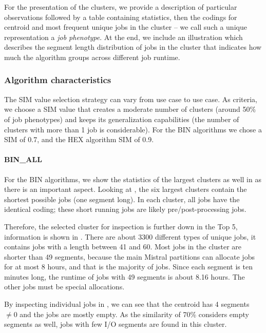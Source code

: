 \documentclass{jhps}
\begin{document}
For the presentation of the clusters, we provide a description of particular observations followed by a table containing statistics, then the codings for centroid and most frequent unique jobs in the cluster -- we call such a unique representation a \textit{job phenotype}.
At the end, we include an illustration which describes the segment length distribution of jobs in the cluster that indicates how much the algorithm groups across different job runtime.

\subsubsection{Algorithm characteristics}
The SIM value selection strategy can vary from use case to use case.
As criteria, we choose a SIM value that creates a moderate number of clusters (around 50\% of job phenotypes) and keeps its generalization capabilities (the number of clusters with more than 1 job is considerable).
For the BIN algorithms we chose a SIM of 0.7, and the HEX algorithm SIM of 0.9.

\FloatBarrier
\paragraph{BIN\_ALL}
For the BIN algorithms, we show the statistics of the largest clusters as well in  as there is an important aspect.
Looking at , the six largest clusters contain the shortest possible jobs (one segment long).
In each cluster, all jobs have the identical coding; these short running jobs are likely pre/post-processing jobs.

Therefore, the selected cluster for inspection is further down in the Top 5, information is shown in .
There are about 3300 different types of unique jobs, it contains jobs with a length between 41 and 60.
Most jobs in the cluster are shorter than 49 segments, because the main Mistral partitions can allocate jobs for at most 8 hours, and that is the majority of jobs.
Since each segment is ten minutes long, the runtime of jobs with 49 segments is about 8.16 hours.
The other jobs must be special allocations.

By inspecting individual jobs in , we can see that the centroid has 4 segments $\neq 0$ and the jobs are mostly empty.
As the similarity of 70\% considers empty segments as well, jobs with few I/O segments are found in this cluster.
\end{document}
